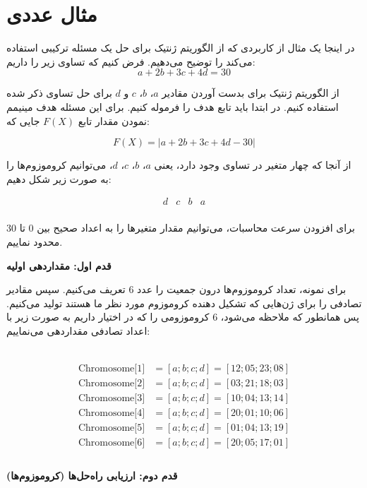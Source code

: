 \documentclass[11pt]{article}
\begin{document}
\section*{مثال عددی}
در اینجا یک مثال از کاربردی که از الگوریتم ژنتیک برای حل یک مسئله ترکیبی استفاده می‌کند را توضیح می‌دهیم. فرض کنیم که تساوی زیر را داریم:
 \[ a + 2b + 3c + 4d = 30 \] 
 
 از الگوریتم ژنتیک برای بدست آوردن مقادیر \(a\)، \(b\)، \(c\) و \(d\) برای حل تساوی ذکر شده استفاده کنیم. در ابتدا باید تابع هدف را فرموله کنیم. برای این مسئله هدف مینیمم نمودن مقدار تابع \( F(X) \) جایی که:

 \[ F(X) = \left| a + 2b + 3c + 4d - 30 \right| \] 
 
 از آنجا که چهار متغیر در تساوی وجود دارد، یعنی \(a\)، \(b\)، \(c\)، \(d\)، می‌توانیم کروموزوم‌ها را به صورت زیر شکل دهیم:

 \[ \begin{array}{cccc} d & c & b & a \\ \end{array} \]  
 
 برای افزودن سرعت محاسبات، می‌توانیم مقدار متغیرها را به اعداد صحیح بین 0 تا 30 محدود نماییم. 
 
 \textbf{قدم اول: مقداردهی اولیه}


  برای نمونه، تعداد کروموزوم‌ها درون جمعیت را عدد 6 تعریف می‌کنیم. سپس مقادیر تصادفی را برای ژن‌هایی که تشکیل دهنده کروموزوم مورد نظر ما هستند تولید می‌کنیم. پس همانطور که ملاحظه می‌شود، 6 کروموزومی را که در اختیار داریم به صورت زیر با اعداد تصادفی مقداردهی می‌نماییم:
 
 \\
\[
\begin{align*}
\text{Chromosome[1]} & = [a; b; c; d] = [12; 05; 23; 08] \\ \text{Chromosome[2]} & = [a; b; c; d] = [03; 21; 18; 03] \\ \text{Chromosome[3]} & = [a; b; c; d] = [10; 04; 13; 14] \\ \text{Chromosome[4]} & = [a; b; c; d] = [20; 01; 10; 06] \\ \text{Chromosome[5]} & = [a; b; c; d] = [01; 04; 13; 19] \\ \text{Chromosome[6]} & = [a; b; c; d] = [20; 05; 17; 01] \\ 
\end{align*}
\]
\\
\textbf{قدم دوم: ارزیابی راه‌حل‌ها (کروموزوم‌ها)}
 
\end{document}
